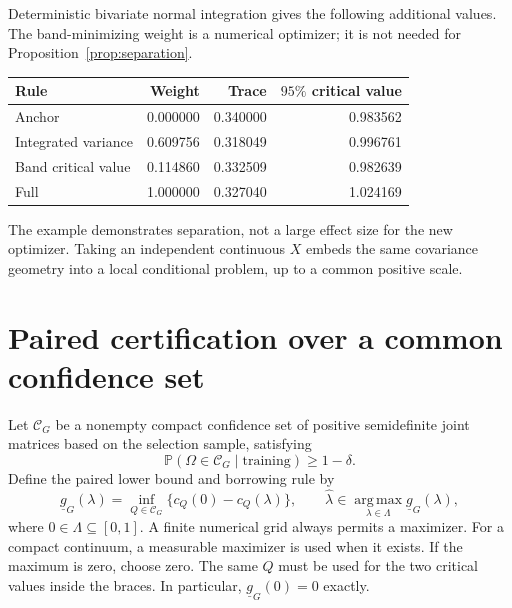 \documentclass[11pt]{article}
\theoremstyle{remark}\newtheorem{remark}[theorem]{Remark}
\newcommand{\Pp}{\mathbb P}
\newcommand{\argmax}{\operatorname*{arg\,max}}
\newcommand{\calC}{\mathcal C}
\begin{document}
Deterministic bivariate normal integration gives the following additional values. The band-minimizing weight is a numerical optimizer; it is not needed for Proposition~\ref{prop:separation}.
\begin{center}
\begin{tabular}{lrrr}
\toprule
Rule & Weight & Trace & $95\%$ critical value\\\midrule
Anchor &0.000000&0.340000&0.983562\\
Integrated variance &0.609756&0.318049&0.996761\\
Band critical value &0.114860&0.332509&0.982639\\
Full &1.000000&0.327040&1.024169\\\bottomrule
\end{tabular}
\end{center}
The example demonstrates separation, not a large effect size for the new optimizer. Taking an independent continuous $X$ embeds the same covariance geometry into a local conditional problem, up to a common positive scale.

\section{Paired certification over a common confidence set}
Let $\calC_G$ be a nonempty compact confidence set of positive semidefinite joint matrices based on the selection sample, satisfying
\begin{equation}
 \Pp(\Omega\in\calC_G\mid\text{training})\geq1-\delta.
 \label{eq:confidence}
\end{equation}
Define the paired lower bound and borrowing rule by
\begin{equation}
 \underline g_G(\lambda)=\inf_{Q\in\calC_G}\{c_Q(0)-c_Q(\lambda)\},\qquad
 \widehat\lambda\in\argmax_{\lambda\in\Lambda}\underline g_G(\lambda),
 \label{eq:rule}
\end{equation}
where $0\in\Lambda\subseteq[0,1]$. A finite numerical grid always permits a maximizer. For a compact continuum, a measurable maximizer is used when it exists. If the maximum is zero, choose zero.
The same $Q$ must be used for the two critical values inside the braces. In particular, $\underline g_G(0)=0$ exactly.
\end{document}
